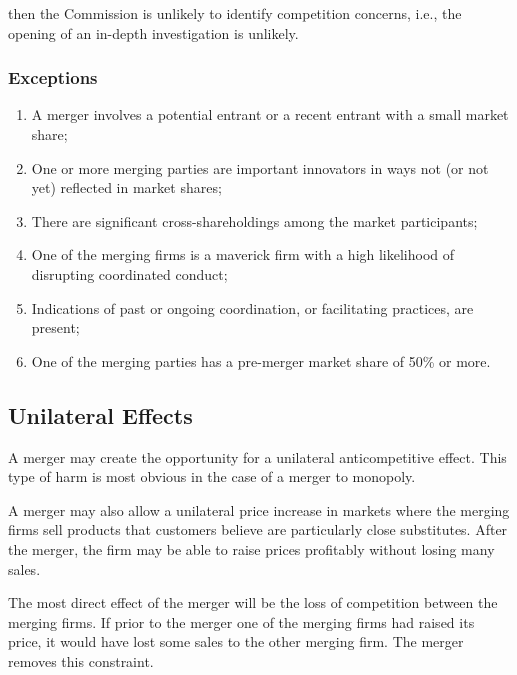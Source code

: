             then the Commission is unlikely to identify competition concerns, i.e., the opening of an in-depth investigation is unlikely.

        \subsubsection{Exceptions}

            \begin{enumerate}[label=(\alph*)]
                \item A merger involves a potential entrant or a recent entrant with a small market share;
                \item One or more merging parties are important innovators in ways not (or not yet) reflected in market shares;
                \item There are significant cross-shareholdings among the market participants;
                \item One of the merging firms is a maverick firm with a high likelihood of disrupting coordinated conduct;
                \item Indications of past or ongoing coordination, or facilitating practices, are present;
                \item One of the merging parties has a pre-merger market share of 50\% or more.
            \end{enumerate}

\newpage
    \subsection{Unilateral Effects}\label{ToH1}

        A merger may create the opportunity for a unilateral anticompetitive effect. This type of harm is most obvious in the case of a merger to monopoly.

        A merger may also allow a unilateral price increase in markets where the merging firms sell products that customers believe are particularly close substitutes. After the merger, the firm may be able to raise prices profitably without losing many sales.
        
        The most direct effect of the merger will be the loss of competition between the merging firms. If prior to the merger one of the merging firms had raised its price, it would have lost some sales to the other merging firm. The merger removes this constraint.
        
